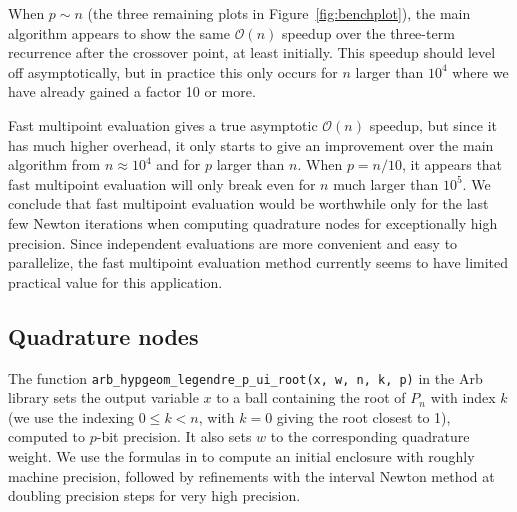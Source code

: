\documentclass{siamart0216}
\newcommand{\OO}{\mathcal{O}}
\begin{document}
When $p \sim n$ (the three remaining plots in Figure~\ref{fig:benchplot}), the main algorithm
appears to show the same $\OO(n)$ speedup
over the three-term recurrence after the crossover point, at least initially.
This speedup should level off asymptotically, but
in practice this only occurs for $n$ larger than $10^4$
where we have already gained a factor 10 or more.

Fast multipoint evaluation gives a true asymptotic $\OO(n)$ speedup,
but since it has much higher overhead,
it only starts to give an improvement over
the main algorithm from $n \approx 10^4$
and for $p$ larger than $n$.
When $p = n / 10$, it appears that
fast multipoint evaluation will only break even for $n$ much larger than $10^5$.
We conclude that fast multipoint evaluation would be
worthwhile only for the last few Newton iterations
when computing quadrature nodes for exceptionally high precision.
Since independent evaluations are more convenient and easy to parallelize,
the fast multipoint evaluation method
currently seems to have limited practical value for this application.

\subsection{Quadrature nodes}

The function
\texttt{arb\_hypgeom\_legendre\_p\_ui\_root(x, w, n, k, p)}
in the Arb library
sets the output variable
$x$ to a ball containing the root of $P_n$ with index $k$ (we use the indexing
$0 \le k < n$, with $k = 0$ giving the root closest to 1),
computed to $p$-bit precision.
It also sets $w$ to the corresponding quadrature weight.
We use the formulas in \cite{petras1999computation} to
compute an initial enclosure with roughly machine precision,
followed by refinements with the interval Newton method
at doubling precision steps for very high precision.
\end{document}
